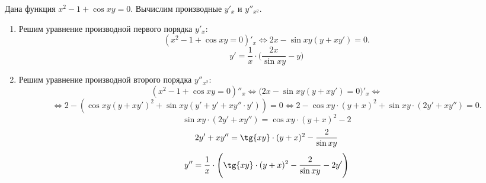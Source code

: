 \documentclass{article}
\begin{document}
\clearpage
Дана функция $x^2-1+\cos{xy} = 0$. Вычислим производные $y'_x$ и $y''_{x^2}$.
\begin{enumerate}
    \item Решим уравнение производной первого порядка $y'_x$:
        \begin{equation*}
            (x^2-1+\cos{xy} = 0)'_x \Leftrightarrow 2x-\sin{xy}(y+xy') = 0.
        \end{equation*}
        \begin{equation*}
            y' = \dfrac{1}{x} \cdot \Bigg( \dfrac{2x}{\sin{xy}} - y \Bigg)
        \end{equation*}
    \item Решим уравнение производной второго порядка $y''_{x^2}$:
\begin{equation*}
(x^2-1+\cos{xy} = 0)''_x \Leftrightarrow
\big(2x-\sin{xy}(y+xy') = 0)'_x \Leftrightarrow
\end{equation*}
\begin{equation*}
\Leftrightarrow
2 - (\cos{xy}(y+xy')^2 + \sin{xy}(y'+y'+xy'' \cdot y')) = 0 \Leftrightarrow
2 - \cos{xy} \cdot (y+x)^2+\sin{xy} \cdot (2y'+xy'') = 0.
\end{equation*}
\begin{equation*}
    \sin{xy} \cdot (2y'+xy'') = \cos{xy} \cdot (y+x)^2 - 2
\end{equation*}
\begin{equation*}
    2y'+xy'' = \tg{xy} \cdot (y+x)^2 - \dfrac{2}{\sin{xy}}
\end{equation*}
\begin{equation*}
    y'' = \dfrac{1}{x} \cdot \Bigg( \tg{xy} \cdot (y+x)^2 - \dfrac{2}{\sin{xy}} -2y' \Bigg)
\end{equation*}
\end{enumerate}
\end{document}
